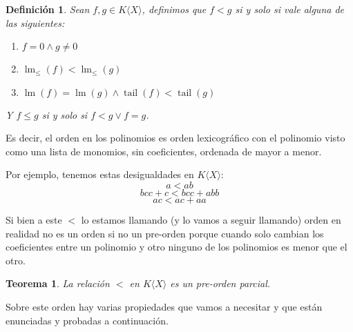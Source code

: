 \documentclass[12pt]{report}
\theoremstyle{customstyle}
\newtheorem{definition}{Definición}[chapter]
\newtheorem{theorem}{Teorema}[chapter]
\theoremstyle{factstyle}
\DeclareMathOperator{\lm}{lm}
\DeclareMathOperator{\tail}{tail}
\begin{document}
\begin{definition}
  Sean $f, g ∈  K⟨X⟩$, definimos que $f < g$ si y solo si vale alguna de las siguientes:
  \begin{enumerate}
    \item $f = 0 ∧ g ≠ 0$
    \item $\lm_≤(f) < \lm_≤(g)$
    \item $\lm(f) = \lm(g) ∧ \tail(f) < \tail(g)$
  \end{enumerate}
  Y $f ≤ g$ si y solo si $f < g ∨ f = g$.
\end{definition}

Es decir, el orden en los polinomios es orden lexicográfico con el polinomio visto como una lista de monomios, sin coeficientes, ordenada de mayor a menor.

Por ejemplo, tenemos estas desigualdades en $K⟨X⟩$:
\[ a < ab \]
\[ bcc + c < bcc + abb \]
\[ ac < ac + aa \]

Si bien a este $<$ lo estamos llamando (y lo vamos a seguir llamando) orden en realidad no es un orden si no un pre-orden porque cuando solo cambian los coeficientes entre un polinomio y otro ninguno de los polinomios es menor que el otro.

\begin{theorem}
  La relación $<$ en $K⟨X⟩$ es un pre-orden parcial.
\end{theorem}

Sobre este orden hay varias propiedades que vamos a necesitar y que están enunciadas y probadas a continuación.
\end{document}
